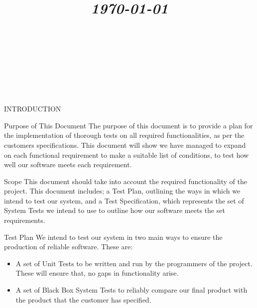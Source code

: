 \documentclass{article}
\title{
	\vspace{1.2in}
	\textmd{\textbf{\doctitle}} \\
	\vspace{0.1in}\large{\textit{\today}} \\
	\vspace{0.4in}
	{\bf{\qanumber}} \\ \vspace{0.4in} %
	\version \\
	\status \\
	\vspace{0.4in}
}
\author{\authors}
\date{}
\begin{document}
	\maketitle
	\newpage
	\tableofcontents
	\newpage

	\begin{section}{INTRODUCTION}
		\begin{subsection}{Purpose of This Document}
			The purpose of this document is to provide a plan for the implementation of thorough tests on all required functionalities, as per the customers specifications. This document will show we have managed to expand on each functional requirement to make a suitable list of conditions, to test how well our software meets each requirement.
		\end{subsection}
				
		\begin{subsection}{Scope}
			This document should take into account the required functionality of the project. This document includes; a Test Plan, outlining the ways in which we intend to test our system, and a Test Specification, which represents the set of System Tests we intend to use to outline how our software meets the set requirements.
		\end{subsection}
		
		\begin{subsection}{Test Plan}
			We intend to test our system in two main ways to ensure the production of reliable software. These are:
			\begin{itemize}
				\item{A set of Unit Tests to be written and run by the programmers of the project. These will ensure that, no gaps in functionality arise.}
				\item{A set of Black Box System Tests to reliably compare our final product with the product that the customer has specified.}
			\end{itemize}
		\end{subsection}
		

\end{section}
\end{document}
